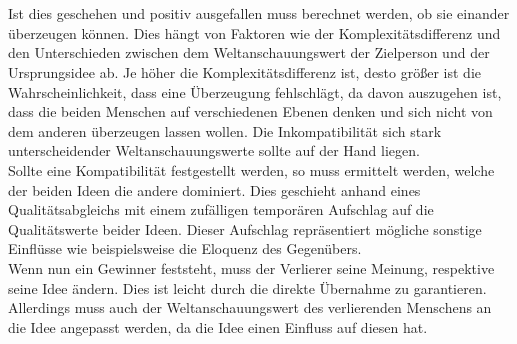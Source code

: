 \quad \\ \quad \\
Ist dies geschehen und positiv ausgefallen muss berechnet werden, ob sie einander überzeugen können.
Dies hängt von Faktoren wie der Komplexitätsdifferenz und den Unterschieden zwischen dem Weltanschauungswert der Zielperson und der Ursprungsidee ab. Je höher die Komplexitätsdifferenz ist, desto größer ist die Wahrscheinlichkeit, dass eine Überzeugung fehlschlägt, da davon auszugehen ist, dass die beiden Menschen auf verschiedenen Ebenen denken und sich nicht von dem anderen überzeugen lassen wollen. Die Inkompatibilität sich stark unterscheidender Weltanschauungswerte sollte auf der Hand liegen. \\
Sollte eine Kompatibilität festgestellt werden, so muss ermittelt werden, welche der beiden Ideen die andere dominiert. Dies geschieht anhand eines Qualitätsabgleichs mit einem zufälligen temporären Aufschlag auf die Qualitätswerte beider Ideen. Dieser Aufschlag repräsentiert mögliche sonstige Einflüsse wie beispielsweise die Eloquenz des Gegenübers. \\
Wenn nun ein Gewinner feststeht, muss der Verlierer seine Meinung, respektive seine Idee ändern. Dies ist leicht durch die direkte Übernahme zu garantieren. Allerdings muss auch der Weltanschauungswert des verlierenden Menschens an die Idee angepasst werden, da die Idee einen Einfluss auf diesen hat. \\

